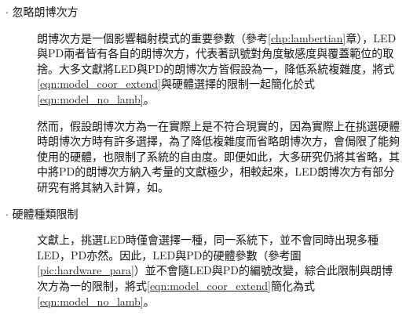         \begin{description}
            \item[$\cdot$ 忽略朗博次方] \hfill
            
            \qquad
            朗博次方是一個影響輻射模式的重要參數（參考\ref{chp:lambertian}章），LED與PD兩者皆有各自的朗博次方，代表著訊號對角度敏感度與覆蓋範位的取捨。大多文獻將LED與PD的朗博次方皆假設為一，降低系統複雜度，將式\ref{eqn:model_coor_extend}與硬體選擇的限制一起簡化於式\ref{eqn:model_no_lamb}。

            \qquad
            然而，假設朗博次方為一在實際上是不符合現實的，因為實際上在挑選硬體時朗博次方時有許多選擇，為了降低複雜度而省略朗博次方，會侷限了能夠使用的硬體，也限制了系統的自由度\cite{survey_light2018}。即便如此，大多研究仍將其省略，其中將PD的朗博次方納入考量的文獻極少\cite{survey_light2018}，相較起來，LED朗博次方有部分研究有將其納入計算，如\cite{case:cart2d}\cite{case:cart3d}。
            
            

            \item[$\cdot$ 硬體種類限制]\hfill
            
            文獻上，挑選LED時僅會選擇一種，同一系統下，並不會同時出現多種LED，PD亦然。因此，LED與PD的硬體參數（參考圖\ref{pic:hardware_para}）並不會隨LED與PD的編號改變，綜合此限制與朗博次方為一的限制，將式\ref{eqn:model_coor_extend}簡化為式\ref{eqn:model_no_lamb}。


\end{description}
